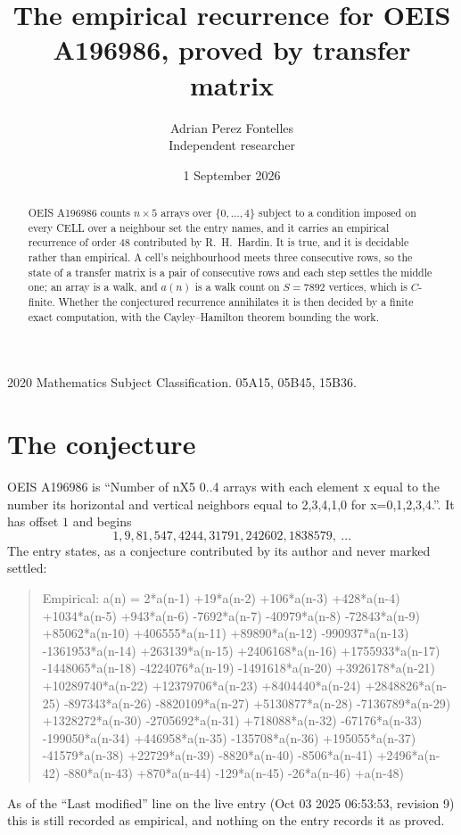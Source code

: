 \documentclass[11pt,a4paper]{article}
\title{The empirical recurrence for OEIS A196986, proved by transfer matrix}
\author{Adrian Perez Fontelles\\ \small Independent researcher}
\date{1 September 2026}
\theoremstyle{plain}
\theoremstyle{definition}
\begin{document}
\maketitle

\begin{abstract}
OEIS A196986 counts $n\times5$ arrays over $\{0,\dots,4\}$ subject to a condition imposed on
every CELL over a neighbour set the entry names, and it carries an empirical recurrence of
order $48$ contributed by R.~H.~Hardin. It is true, and it is decidable rather than
empirical. A cell's neighbourhood meets three consecutive rows, so the state of a transfer
matrix is a pair of consecutive rows and each step settles the middle one; an array is a
walk, and $a(n)$ is a walk count on $S=7892$ vertices, which is $C$-finite. Whether the
conjectured recurrence annihilates it is then decided by a finite exact computation, with the
Cayley--Hamilton theorem bounding the work.
\end{abstract}

\noindent\small 2020 Mathematics Subject Classification. 05A15, 05B45, 15B36.\normalsize

\section{The conjecture}

OEIS A196986 is ``Number of nX5 0..4 arrays with each element x equal to the number its horizontal and vertical neighbors equal to 2,3,4,1,0 for x=0,1,2,3,4.''. It has offset $1$ and begins
\[
1, 9, 81, 547, 4244, 31791, 242602, 1838579,\ \dots
\]
The entry states, as a conjecture contributed by its author and never marked settled:
\begin{quote}
Empirical: a(n) = 2*a(n-1) +19*a(n-2) +106*a(n-3) +428*a(n-4) +1034*a(n-5) +943*a(n-6) -7692*a(n-7) -40979*a(n-8) -72843*a(n-9) +85062*a(n-10) +406555*a(n-11) +89890*a(n-12) -990937*a(n-13) -1361953*a(n-14) +263139*a(n-15) +2406168*a(n-16) +1755933*a(n-17) -1448065*a(n-18) -4224076*a(n-19) -1491618*a(n-20) +3926178*a(n-21) +10289740*a(n-22) +12379706*a(n-23) +8404440*a(n-24) +2848826*a(n-25) -897343*a(n-26) -8820109*a(n-27) +5130877*a(n-28) -7136789*a(n-29) +1328272*a(n-30) -2705692*a(n-31) +718088*a(n-32) -67176*a(n-33) -199050*a(n-34) +446958*a(n-35) -135708*a(n-36) +195055*a(n-37) -41579*a(n-38) +22729*a(n-39) -8820*a(n-40) -8506*a(n-41) +2496*a(n-42) -880*a(n-43) +870*a(n-44) -129*a(n-45) -26*a(n-46) +a(n-48)
\end{quote}
As of the ``Last modified'' line on the live entry (Oct 03 2025 06:53:53, revision 9) this is still
recorded as empirical, and nothing on the entry records it as proved.
\end{document}
